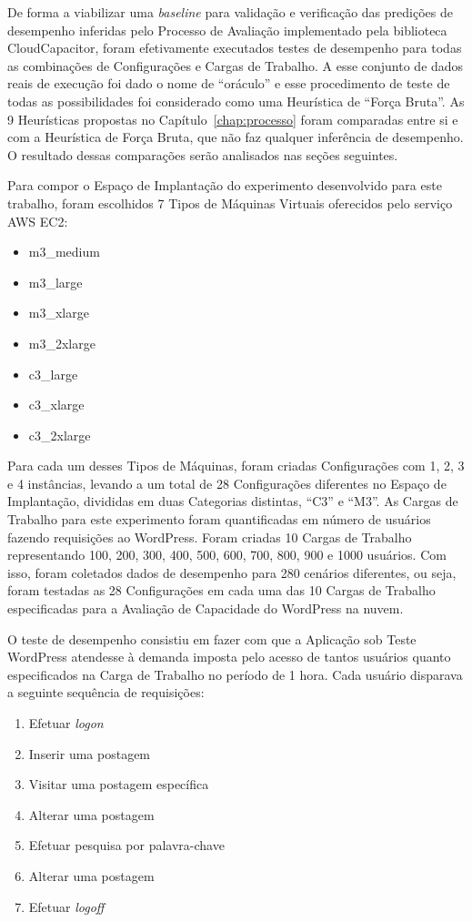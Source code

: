 De forma a viabilizar uma \emph{baseline} para validação e verificação das 
predições de desempenho inferidas pelo Processo de Avaliação implementado pela 
biblioteca CloudCapacitor, foram efetivamente executados testes de desempenho 
para todas as combinações de Configurações e Cargas de Trabalho. A esse conjunto
de dados reais de execução foi dado o nome de ``oráculo'' e esse procedimento
de teste de todas as possibilidades foi considerado como uma Heurística de ``Força
Bruta''. As 9 Heurísticas propostas no Capítulo~\ref{chap:processo} foram comparadas
entre si e com a Heurística de Força Bruta, que não faz qualquer inferência de
desempenho. O resultado dessas comparações serão analisados nas seções seguintes.

Para compor o Espaço de Implantação do experimento desenvolvido para este trabalho, 
foram escolhidos 7 Tipos de Máquinas Virtuais oferecidos pelo serviço AWS EC2:

\begin{itemize}
  \item m3\_medium 
  \item m3\_large
  \item m3\_xlarge
  \item m3\_2xlarge
  \item c3\_large
  \item c3\_xlarge
  \item c3\_2xlarge
\end{itemize}

Para cada um desses Tipos de Máquinas, foram criadas Configurações com 1, 2, 3 e 4
instâncias, levando a um total de 28 Configurações diferentes no Espaço de Implantação,
divididas em duas Categorias distintas, ``C3'' e ``M3''. As Cargas de Trabalho
para este experimento foram quantificadas em número de usuários fazendo
requisições ao WordPress. Foram criadas 10 Cargas de Trabalho representando
100, 200, 300, 400, 500, 600, 700, 800, 900 e 1000 usuários. Com isso, foram
coletados dados de desempenho para 280 cenários diferentes, ou seja, foram 
testadas as 28 Configurações em cada uma das 10 Cargas de Trabalho especificadas 
para a Avaliação de Capacidade do WordPress na nuvem.

O teste de desempenho consistiu em fazer com que a Aplicação sob Teste WordPress
atendesse à demanda imposta pelo acesso de tantos usuários quanto especificados 
na Carga de Trabalho no período de 1 hora. Cada usuário disparava a seguinte
sequência de requisições:

\begin{enumerate}
  \item Efetuar \emph{logon}
  \item Inserir uma postagem
  \item Visitar uma postagem específica
  \item Alterar uma postagem
  \item Efetuar pesquisa por palavra-chave
  \item Alterar uma postagem
  \item Efetuar \emph{logoff}
\end{enumerate}

